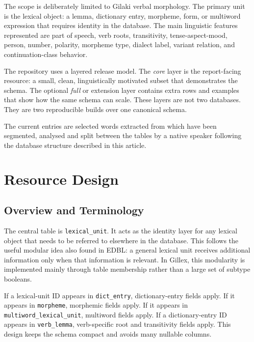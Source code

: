 \documentclass[11pt]{article}
\newcommand{\code}[1]{\texttt{#1}}
\begin{document}
The scope is deliberately limited to Gilaki verbal morphology. The primary unit is the lexical object: a lemma, dictionary entry, morpheme, form, or multiword expression that requires identity in the database. The main linguistic features represented are part of speech, verb roots, transitivity, tense-aspect-mood, person, number, polarity, morpheme type, dialect label, variant relation, and continuation-class behavior.

The repository uses a layered release model. The \emph{core} layer is the report-facing resource: a small, clean, linguistically motivated subset that demonstrates the schema. The optional \emph{full} or extension layer contains extra rows and examples that show how the same schema can scale. These layers are not two databases. They are two reproducible builds over one canonical schema.

The current entries are selected words extracted from \citet{rastorgueva2012gilaki} which have been segmented, analysed and split between the tables by a native speaker following the database structure described in this article. 

\section{Resource Design}

\subsection{Overview and Terminology}

The central table is \code{lexical\_unit}. It acts as the identity layer for any lexical object that needs to be referred to elsewhere in the database. This follows the useful modular idea also found in EDBL: a general lexical unit receives additional information only when that information is relevant. In Gillex, this modularity is implemented mainly through table membership rather than a large set of subtype booleans.

If a lexical-unit ID appears in \code{dict\_entry}, dictionary-entry fields apply. If it appears in \code{morpheme}, morphemic fields apply. If it appears in \code{multiword\_lexical\_unit}, multiword fields apply. If a dictionary-entry ID appears in \code{verb\_lemma}, verb-specific root and transitivity fields apply. This design keeps the schema compact and avoids many nullable columns.
\end{document}
